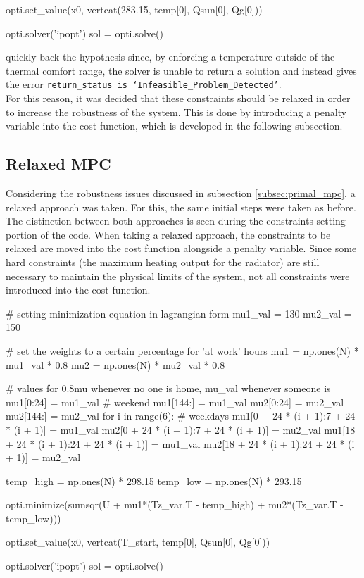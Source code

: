 \begin{python}
opti.set_value(x0, vertcat(283.15, temp[0], Qsun[0], Qg[0]))

opti.solver('ipopt')
sol = opti.solve()
\end{python}

quickly back the hypothesis since, by enforcing a temperature outside of the thermal comfort range, the solver is unable to return a solution and instead gives the error \texttt{return\_status is `Infeasible\_Problem\_Detected'}.\\

For this reason, it was decided that these constraints should be relaxed in order to increase the robustness of the system. This is done by introducing a penalty variable into the cost function, which is developed in the following subsection.

\newpage
\subsection{Relaxed MPC}
\label{subsec:relaxed_mpc}
Considering the robustness issues discussed in subsection \ref{subsec:primal_mpc}, a relaxed approach was taken. For this, the same initial steps were taken as before. The distinction between both approaches is seen during the constraints setting portion of the code. When taking a relaxed approach, the constraints to be relaxed are moved into the cost function alongside a penalty variable. Since some hard constraints (the maximum heating output for the radiator) are still necessary to maintain the physical limits of the system, not all constraints were introduced into the cost function. 

\begin{python}
    # setting minimization equation in lagrangian form
    mu1_val = 130
    mu2_val = 150

    # set the weights to a certain percentage for 'at work' hours
    mu1 = np.ones(N) * mu1_val * 0.8
    mu2 = np.ones(N) * mu2_val * 0.8

    # values for 0.8mu whenever no one is home, mu_val whenever someone is
    mu1[0:24] = mu1_val  # weekend
    mu1[144:] = mu1_val
    mu2[0:24] = mu2_val
    mu2[144:] = mu2_val
    for i in range(6):  # weekdays
        mu1[0 + 24 * (i + 1):7 + 24 * (i + 1)] = mu1_val
        mu2[0 + 24 * (i + 1):7 + 24 * (i + 1)] = mu2_val
        mu1[18 + 24 * (i + 1):24 + 24 * (i + 1)] = mu1_val
        mu2[18 + 24 * (i + 1):24 + 24 * (i + 1)] = mu2_val

    temp_high = np.ones(N) * 298.15
    temp_low = np.ones(N) * 293.15

    opti.minimize(sumsqr(U + mu1*(Tz_var.T - temp_high) + mu2*(Tz_var.T - temp_low)))

    opti.set_value(x0, vertcat(T_start, temp[0], Qsun[0], Qg[0]))

    opti.solver('ipopt')
    sol = opti.solve()
\end{python}

